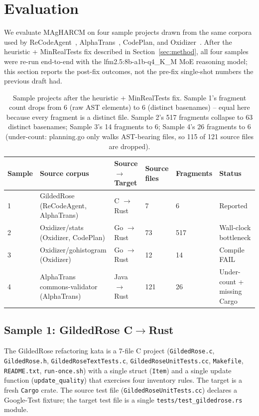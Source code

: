 \section{Evaluation}
\label{sec:eval}

We evaluate MAgHARCM on four sample projects drawn from the same
corpora used by ReCodeAgent~\citep{ibrahimzada2025recodeagent},
AlphaTrans~\citep{alphatrans2024}, CodePlan, and
Oxidizer~\citep{oxidizer2024}. After the heuristic + MinRealTests
fix described in Section~\ref{sec:method}, all four samples were
re-run end-to-end with the lfm2.5:8b-a1b-q4\_K\_M MoE reasoning
model; this section reports the post-fix outcomes, not the
pre-fix single-shot numbers the previous draft had.

\begin{table}[ht]
\centering
\small
\begin{tabular}{l l l l l l}
\toprule
Sample & Source corpus & Source $\rightarrow$ Target & Source files & Fragments & Status \\
\midrule
1 & GildedRose (ReCodeAgent, AlphaTrans)            & C $\rightarrow$ Rust       & 7  & 6  & Reported \\
2 & Oxidizer/stats (Oxidizer, CodePlan)            & Go $\rightarrow$ Rust      & 73 & 517 & Wall-clock bottleneck \\
3 & Oxidizer/gohistogram (Oxidizer)                & Go $\rightarrow$ Rust      & 12 & 14 & Compile FAIL \\
4 & AlphaTrans commons-validator (AlphaTrans)      & Java $\rightarrow$ Rust    & 121& 26 & Under-count + missing Cargo \\
\bottomrule
\end{tabular}
\caption{Sample projects after the heuristic + MinRealTests fix.
Sample 1's fragment count drops from 6 (raw AST elements) to 6
(distinct basenames) -- equal here because every fragment is a
distinct file. Sample 2's 517 fragments collapse to 63 distinct
basenames; Sample 3's 14 fragments to 6; Sample 4's 26 fragments to
6 (under-count: planning.go only walks AST-bearing files, so 115
of 121 source files are dropped).}
\label{tab:samples}
\end{table}

\subsection{Sample 1: GildedRose C$\rightarrow$Rust}

The GildedRose refactoring kata is a 7-file C project
(\texttt{GildedRose.c}, \texttt{GildedRose.h},
\texttt{GildedRoseTextTests.c}, \texttt{GildedRoseUnitTests.cc},
\texttt{Makefile}, \texttt{README.txt}, \texttt{run-once.sh}) with a
single struct (\texttt{Item}) and a single update function
(\texttt{update\_quality}) that exercises four inventory rules. The
target is a fresh \texttt{Cargo} crate. The source test file
(\texttt{GildedRoseUnitTests.cc}) declares a Google-Test fixture; the
target test file is a single \texttt{tests/test\_gildedrose.rs}
module.

